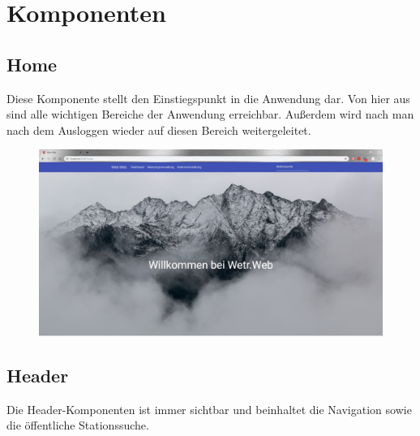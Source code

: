 \documentclass[10pt,a4paper,margin=0pt]{scrartcl}
\begin{document}
\pagebreak
\section{Komponenten}
\subsection{Home}
Diese Komponente stellt den Einstiegspunkt in die Anwendung dar. Von hier aus sind alle wichtigen Bereiche der Anwendung erreichbar. Außerdem wird nach man nach dem Ausloggen wieder auf diesen Bereich weitergeleitet.
\begin{figure}[H]
\includegraphics[width=\textwidth]{./img/home.jpg}
\centering
\end{figure}
\subsection{Header}
Die Header-Komponenten ist immer sichtbar und beinhaltet die Navigation sowie die öffentliche Stationssuche.
\pagebreak
\end{document}

